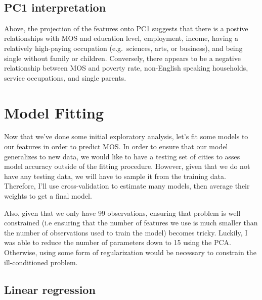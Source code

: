 \documentclass{article}
\begin{document}
    \begin{center}
    \end{center}
    { \hspace*{\fill} \\}
    
    \subsection{PC1 interpretation}\label{pc1-interpretation}

Above, the projection of the features onto PC1 suggests that there is a
postive relationships with MOS and education level, employment, income,
having a relatively high-paying occupation (e.g.~sciences, arts, or
business), and being single without family or children. Conversely,
there appears to be a negative relationship between MOS and poverty
rate, non-English speaking households, service occupations, and single
parents.

    \section{Model Fitting}\label{model-fitting}

Now that we've done some initial exploratory analysis, let's fit some
models to our features in order to predict MOS. In order to ensure that
our model generalizes to new data, we would like to have a testing set
of cities to asses model accuracy outside of the fitting procedure.
However, given that we do not have any testing data, we will have to
sample it from the training data. Therefore, I'll use cross-validation
to estimate many models, then average their weights to get a final
model.

Also, given that we only have 99 observations, ensuring that problem is
well constrained (i.e ensuring that the number of features we use is
much smaller than the number of observations used to train the model)
becomes tricky. Luckily, I was able to reduce the number of parameters
down to 15 using the PCA. Otherwise, using some form of regularization
would be necessary to constrain the ill-conditioned problem.

    \subsection{Linear regression}\label{linear-regression}
\end{document}
